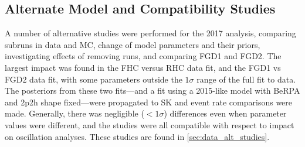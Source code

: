 


\subsection{Alternate Model and Compatibility Studies}
A number of alternative studies were performed for the 2017 analysis, comparing subruns in data and MC, change of model parameters and their priors, investigating effects of removing runs, and comparing FGD1 and FGD2. The largest impact was found in the FHC versus RHC data fit, and the FGD1 vs FGD2 data fit, with some parameters outside the $1\sigma$ range of the full fit to data. The posteriors from these two fits---and a fit using a 2015-like model with BeRPA and 2p2h shape fixed---were propagated to SK and event rate comparisons were made. Generally, there was negligible ($<1\sigma$) differences even when parameter values were different, and the studies were all compatible with respect to impact on oscillation analyses. These studies are found in \autoref{sec:data_alt_studies}.

